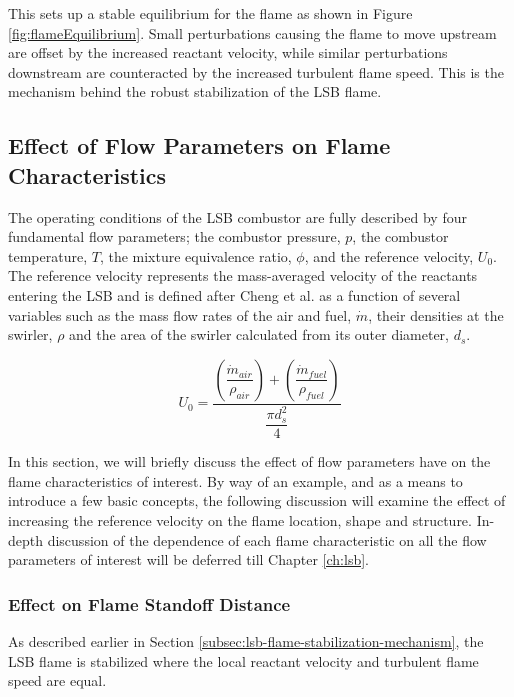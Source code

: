 This sets up a stable equilibrium for the flame as shown in Figure \ref{fig:flameEquilibrium}.
Small perturbations causing the flame to move upstream are offset by the increased reactant velocity, while similar perturbations downstream are counteracted by the increased turbulent flame speed.
This is the mechanism behind the robust stabilization of the LSB flame.

\subsection{Effect of Flow Parameters on Flame Characteristics}

The operating conditions of the LSB combustor are fully described by four fundamental flow parameters; the combustor pressure, \(p\), the combustor temperature, \(T\), the mixture equivalence ratio, \(\phi\), and the reference velocity, \(U_0\).
The reference velocity represents the mass-averaged velocity of the reactants entering the LSB and is defined after Cheng et al.\cite{2000-cheng} as a function of several variables such as the mass flow rates of the air and fuel, \(\dot{m}\), their densities at the swirler, \(\rho\) and the area of the swirler calculated from its outer diameter, \(d_s\).

\begin{equation}
U_0 = \frac{ \left( \dfrac{ \dot{m}_{air} }{ \rho_{air} } \right) + \left( \dfrac{ \dot{m}_{fuel} }{ \rho_{fuel} }\right) }{ \dfrac{\pi d_s^2 }{4} }
\label{eqn:referenceVelocity}
\end{equation}

In this section, we will briefly discuss the effect of flow parameters have on the flame characteristics of interest.
By way of an example, and as a means to introduce a few basic concepts, the following discussion will examine the effect of increasing the reference velocity on the flame location, shape and structure.
In-depth discussion of the dependence of each flame characteristic on all the flow parameters of interest will be deferred till Chapter \ref{ch:lsb}.

\subsubsection{Effect on Flame Standoff Distance}

As described earlier in Section \ref{subsec:lsb-flame-stabilization-mechanism}, the LSB flame is stabilized where the local reactant velocity and turbulent flame speed are equal.


